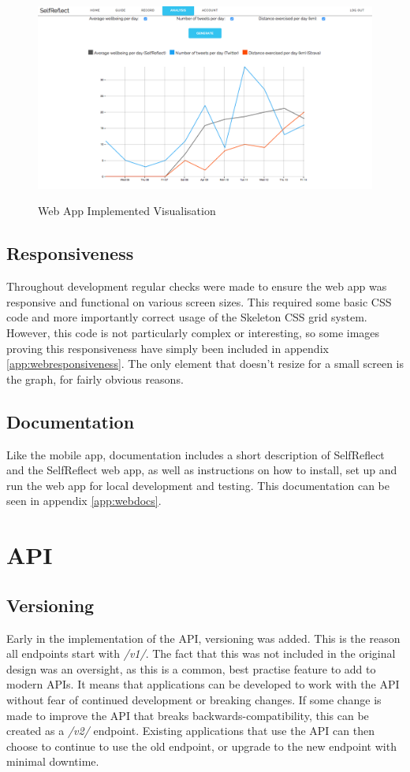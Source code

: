 \documentclass[11pt,openright,a4paper]{report}
\begin{document}
\begin{figure}[ht]
\centering
\caption{Web App Implemented Visualisation}
\includegraphics[width=\textwidth]{i/webanalysisgraph.png}
\label{fig:webanalysisgraph}
\end{figure}

\newpage
\subsection{Responsiveness}
Throughout development regular checks were made to ensure the web app was responsive and functional on various screen sizes. This required some basic CSS code and more importantly correct usage of the Skeleton CSS grid system. However, this code is not particularly complex or interesting, so some images proving this responsiveness have simply been included in appendix \ref{app:webresponsiveness}. The only element that doesn't resize for a small screen is the graph, for fairly obvious reasons.

\subsection{Documentation}
Like the mobile app, documentation includes a short description of SelfReflect and the SelfReflect web app, as well as instructions on how to install, set up and run the web app for local development and testing. This documentation can be seen in appendix \ref{app:webdocs}.

\section{API} \label{sec:apiimpl}
\subsection{Versioning}
Early in the implementation of the API, versioning was added. This is the reason all endpoints start with \emph{/v1/}. The fact that this was not included in the original design was an oversight, as this is a common, best practise feature to add to modern APIs. It means that applications can be developed to work with the API without fear of continued development or breaking changes. If some change is made to improve the API that breaks backwards-compatibility, this can be created as a \emph{/v2/} endpoint. Existing applications that use the API can then choose to continue to use the old endpoint, or upgrade to the new endpoint with minimal downtime.
\end{document}
